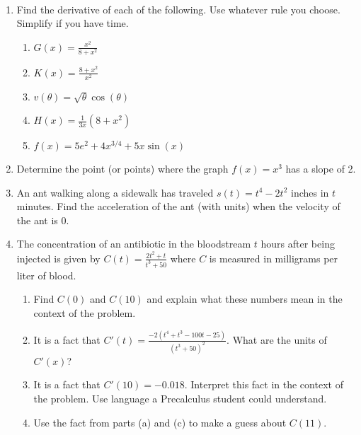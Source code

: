 \documentclass[11pt,fleqn]{article}
\begin{document}
\renewcommand{\headrulewidth}{0pt}
\newcommand{\blank}[1]{\rule{#1}{0.75pt}}
\newcommand{\bc}{\begin{center}}
\newcommand{\ec}{\end{center}}
\renewcommand{\d}{\displaystyle}

\vspace*{-0.7in}

\begin{center}
  \large
  \\
\end{center}
\begin{enumerate}
\item Find the derivative of each of the following. Use whatever rule you choose. Simplify if you have time.
	\begin{enumerate}
	\item $G(x)=\frac{x^2}{8+ x^2}$
	\vfill
	\item $K(x)=\frac{8+ x^2}{x^2}$
	\vfill
	\item $v(\theta)=\sqrt{\theta}\cos(\theta)$
	\vfill
	\item $H(x)=\frac{1}{3x}(8+x^2)$
	\vfill
	\item $f(x)=5e^2+4{x}^{3/4}+5x\sin(x)$\\
	\vfill
	\end{enumerate}
\newpage
\item Determine the point (or points) where the graph $f(x)=x^3$ has a slope of 2. 
\vfill

\item An ant walking along a sidewalk has traveled $s(t)=t^4-2t^2$ inches in $t$ minutes.  Find the acceleration of the ant (with units) when the velocity of the ant is 0.
\vfill

\item The concentration of an antibiotic in the bloodstream $t$ hours after being injected is given by $\displaystyle{C(t)=\frac{2t^2+t}{t^3+50}}$ where $C$ is measured in milligrams per liter of blood.	
	\begin{enumerate} 
	\item Find $C(0)$ and $C(10)$ and explain what these numbers mean in the context of the problem. \\
	\vspace{.5in}
	\item It is a fact that $C'(t)=\frac{-2(t^4+t^3-100t-25)}{(t^3+50)^2}.$ What are the units of $C'(x)$?
	\vspace{.5in}
	
	\item It is a fact that $C'(10)=-0.018.$ Interpret this fact in the context of the problem. Use language a Precalculus student could understand. \\
	\vspace{.5in}
	
	\item Use the fact from parts (a) and (c) to make a guess about $C(11).$
	\vspace{.5in}
	\end{enumerate}

\end{enumerate}
\end{document}
